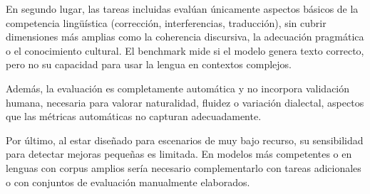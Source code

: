 En segundo lugar, las tareas incluidas evalúan únicamente aspectos básicos de la competencia lingüística (corrección, interferencias, traducción), sin cubrir dimensiones más amplias como la coherencia discursiva, la adecuación pragmática o el conocimiento cultural. El benchmark mide si el modelo genera texto correcto, pero no su capacidad para usar la lengua en contextos complejos.

Además, la evaluación es completamente automática y no incorpora validación humana, necesaria para valorar naturalidad, fluidez o variación dialectal, aspectos que las métricas automáticas no capturan adecuadamente.

Por último, al estar diseñado para escenarios de muy bajo recurso, su sensibilidad para detectar mejoras pequeñas es limitada. En modelos más competentes o en lenguas con corpus amplios sería necesario complementarlo con tareas adicionales o con conjuntos de evaluación manualmente elaborados.
